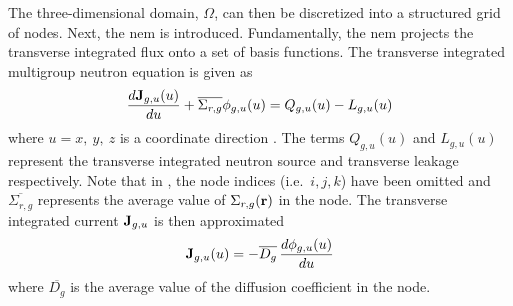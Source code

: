     The three-dimensional domain, $\Omega$, can then be discretized into a
    structured grid of nodes. Next, the \gls{nem} is introduced. Fundamentally,
    the \gls{nem} projects the transverse integrated flux onto a set of basis
    functions. The transverse integrated multigroup neutron equation is given as
    \begin{equation}
      \label{eq:transverse_multigroup_diffusion}
      \frac{d \mathbf{J}_{g,u} (u)}{d u} + \overline{\Sigma_{r,g}}
        \phi_{g,u}(u) = Q_{g,u}(u) - L_{g,u}(u)
    \end{equation}
    where $u = x,\ y,\ z$ is a coordinate direction \cite{qe2paper}. The terms 
    $Q_{g,u}(u)$ and $L_{g,u}(u)$ represent the transverse integrated neutron
    source and transverse leakage respectively. Note that in
    , the node indices
    (i.e.~$i,j,k$) have been omitted and $\overline{\Sigma_{r,g}}$ represents
    the average value of $\Sigma_{r,g}(\mathbf{r})$ in the node. The transverse
    integrated current $\mathbf{J}_{g,u}$ is then approximated
    \begin{equation}
      \label{eq:current_approximation}
      \mathbf{J}_{g,u}(u) = - \overline{D_g} \, \frac{d \phi_{g,u}(u)}{du}
    \end{equation}
    where $\overline{D_g}$ is the average value of the diffusion coefficient in
    the node.

